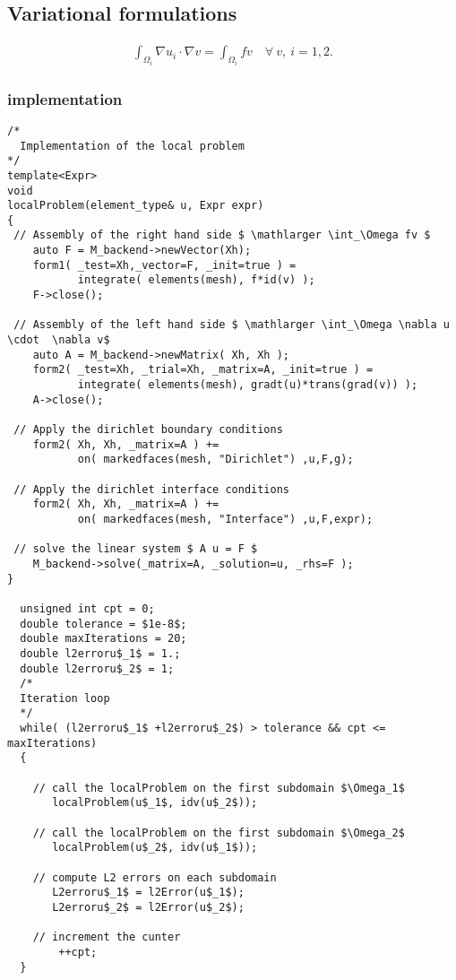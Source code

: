 \subsection{Variational formulations}
\label{sec:vari-form-2}

\begin{equation*}
  \begin{aligned}
    \int_{\Omega_i} \nabla u_i \cdot \nabla v = \int_{\Omega_i} fv   \quad \forall~ v,~i=1,2.
  \end{aligned}
\end{equation*}

\subsubsection{\FEEL implementation}
\label{sec:feel-implementation}
\begin{lstlisting}
/*
  Implementation of the local problem
*/
template<Expr>
void
localProblem(element_type& u, Expr expr)
{
 // Assembly of the right hand side $ \mathlarger \int_\Omega fv $
    auto F = M_backend->newVector(Xh);
    form1( _test=Xh,_vector=F, _init=true ) =
           integrate( elements(mesh), f*id(v) );
    F->close();

 // Assembly of the left hand side $ \mathlarger \int_\Omega \nabla u \cdot  \nabla v$
    auto A = M_backend->newMatrix( Xh, Xh );
    form2( _test=Xh, _trial=Xh, _matrix=A, _init=true ) =
           integrate( elements(mesh), gradt(u)*trans(grad(v)) );
    A->close();

 // Apply the dirichlet boundary conditions
    form2( Xh, Xh, _matrix=A ) +=
           on( markedfaces(mesh, "Dirichlet") ,u,F,g);

 // Apply the dirichlet interface conditions
    form2( Xh, Xh, _matrix=A ) +=
           on( markedfaces(mesh, "Interface") ,u,F,expr);

 // solve the linear system $ A u = F $
    M_backend->solve(_matrix=A, _solution=u, _rhs=F );
}

  unsigned int cpt = 0;
  double tolerance = $1e-8$;
  double maxIterations = 20;
  double l2erroru$_1$ = 1.;
  double l2erroru$_2$ = 1;
  /*
  Iteration loop
  */
  while( (l2erroru$_1$ +l2erroru$_2$) > tolerance && cpt <= maxIterations)
  {

    // call the localProblem on the first subdomain $\Omega_1$
       localProblem(u$_1$, idv(u$_2$));

    // call the localProblem on the first subdomain $\Omega_2$
       localProblem(u$_2$, idv(u$_1$));

    // compute L2 errors on each subdomain
       L2erroru$_1$ = l2Error(u$_1$);
       L2erroru$_2$ = l2Error(u$_2$);

    // increment the cunter
        ++cpt;
  }

\end{lstlisting}

